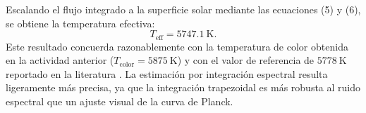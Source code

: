 \documentclass[12pt, a4paper]{article}
\begin{document}
Escalando el flujo integrado a la superficie solar mediante las ecuaciones (5) y (6), se obtiene la temperatura efectiva:
\begin{equation*}
    T_\mathrm{eff} = 5747.1\ \mathrm{K}.
\end{equation*}
Este resultado concuerda razonablemente con la temperatura de color obtenida en la actividad anterior ($T_\mathrm{color} = 5875\ \mathrm{K}$) y con el valor de referencia de $5778\ \mathrm{K}$ reportado en la literatura \cite{stix2002}. La estimación por integración espectral resulta ligeramente más precisa, ya que la integración trapezoidal es más robusta al ruido espectral que un ajuste visual de la curva de Planck.



\end{document}
